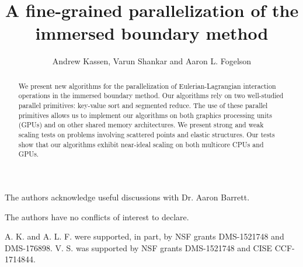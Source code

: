 \documentclass[Afour,sageh,times]{sagej}
\begin{document}
\title{%
A fine-grained parallelization of the immersed boundary method
}

\author{%
Andrew Kassen,
Varun Shankar and
Aaron L. Fogelson
}



\begin{abstract}
We present new algorithms for the parallelization of Eulerian-Lagrangian interaction
operations in the immersed boundary method. Our algorithms rely on two well-studied
parallel primitives: key-value sort and segmented reduce. The use of these parallel
primitives allows us to implement our algorithms on both graphics processing units (GPUs)
and on other shared memory architectures. We present strong and weak scaling tests on
problems involving scattered points and elastic structures. Our tests show that our
algorithms exhibit near-ideal scaling on both multicore CPUs and GPUs\@.
\end{abstract}


\maketitle







\begin{acks}
The authors acknowledge useful discussions with Dr. Aaron Barrett.
\end{acks}

\begin{dci}
The authors have no conflicts of interest to declare.
\end{dci}

\begin{funding}
A. K. and A. L. F. were supported, in part, by NSF grants DMS-1521748 and DMS-176898.
V. S. was supported by NSF grants DMS-1521748 and CISE CCF-1714844.
\end{funding}



\end{document}
